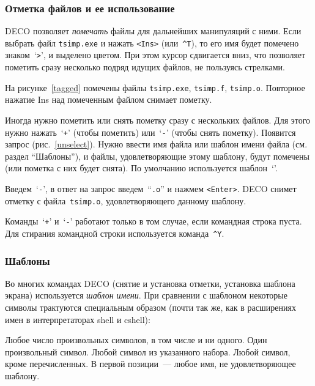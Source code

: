 
\subsubsection{Отметка файлов и ее использование}

DECO позволяет {\em помечать} файлы для дальнейших манипуляций с
ними. Если выбрать файл {\tt tsimp.exe} и нажать {\tt <Ins>} (или~{\tt \^{}T}), то
его имя будет помечено знаком~`{\tt >}', и выделено цветом.
При этом курсор сдвигается вниз, что позволяет пометить сразу
несколько подряд идущих файлов, не пользуясь стрелками.


На рисунке~\ref{tagged} помечены файлы {\tt tsimp.exe}, {\tt tsimp.f},
{\tt tsimp.o}. Повторное нажатие Ins над помеченным файлом снимает пометку.


Иногда нужно пометить или снять пометку сразу с нескольких файлов.
Для этого нужно нажать~`{\tt +}' (чтобы пометить) или~`{\tt -}'
(чтобы снять пометку). Появится запрос (рис.~\ref{unselect}).
Нужно ввести имя файла или шаблон имени файла (см. раздел ``Шаблоны''),
и файлы, удовлетворяющие этому шаблону, будут помечены (или
пометка с них будет снята). По умолчанию используется шаблон~`{\tt *}'.

Введем~`{\tt -}', в ответ на запрос введем~``{\tt *.o}''
и нажмем {\tt <Enter>}. DECO снимет отметку с файла~{\tt tsimp.o},
удовлетворяющего данному шаблону.

Команды~`{\tt +}' и~`{\tt -}' работают только в том случае,
если командная строка пуста. Для стирания командной строки
используется команда~{\tt \^{}Y}.

\subsubsection{Шаблоны}

Во многих командах DECO (снятие и установка отметки,
установка шаблона экрана) используется {\em шаблон имени}.
При сравнении с шаблоном некоторые символы трактуются
специальным образом (почти так же, как в расширениях имен в
интерпретаторах shell и cshell):

\begin{example}
\litem{{\tt *}}
Любое число произвольных символов, в том числе и ни одного.
Один произвольный символ.
\litem{{\tt [ab0-9]}}
Любой символ из указанного набора.
\litem{{\tt [\^{}ab0-9]}}
Любой символ, кроме перечисленных.
\litem{{\tt \^{}}}
В первой позиции~--- любое имя, не удовлетворяющее шаблону.
\end{example}

